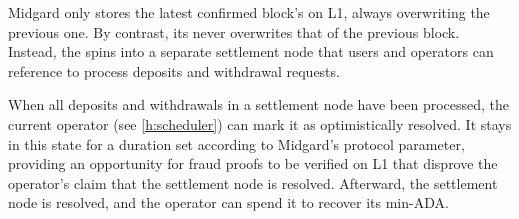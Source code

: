 \documentclass[../midgard.tex]{subfiles}
\begin{document}
Midgard only stores the latest confirmed block's  on L1, always overwriting the previous one.
By contrast, its  never overwrites that of the previous block.
Instead, the  spins into a separate settlement node that users and operators can reference to process deposits and withdrawal requests.

When all deposits and withdrawals in a settlement node have been processed, the current operator (see \cref{h:scheduler}) can mark it as optimistically resolved.
It stays in this state for a duration set according to Midgard's  protocol parameter, providing an opportunity for fraud proofs to be verified on L1 that disprove the operator's claim that the settlement node is resolved.
Afterward, the settlement node is resolved, and the operator can spend it to recover its min-ADA.

\end{document}
